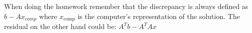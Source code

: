 \begin{remarks}
When doing the homework remember that the discrepancy  is always defined as $b-Ax_{comp}$ where $x_{\text{comp}}$ is the computer's representation of the solution. The residual on the other hand could be: $A^Tb - A^TAx$
\end{remarks}
